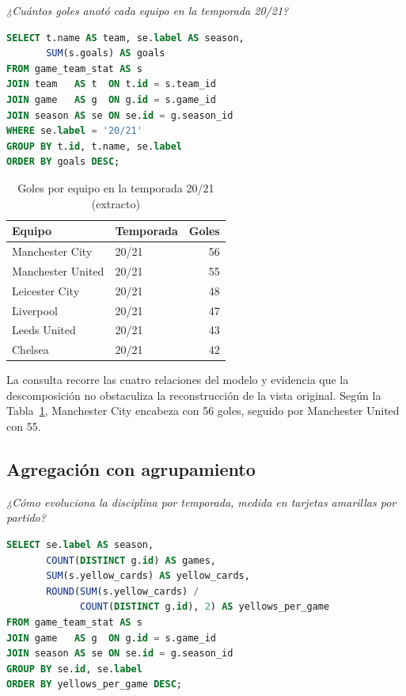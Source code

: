 \documentclass[conference]{IEEEtran}
\begin{document}
\emph{¿Cuántos goles anotó cada equipo en la temporada 20/21?}

\begin{lstlisting}[language=SQL]
SELECT t.name AS team, se.label AS season,
       SUM(s.goals) AS goals
FROM game_team_stat AS s
JOIN team   AS t  ON t.id = s.team_id
JOIN game   AS g  ON g.id = s.game_id
JOIN season AS se ON se.id = g.season_id
WHERE se.label = '20/21'
GROUP BY t.id, t.name, se.label
ORDER BY goals DESC;
\end{lstlisting}

\begin{table}[htbp]
\caption{Goles por equipo en la temporada 20/21 (extracto)}
\label{tab:goles2021}
\centering
\begin{tabular}{llr}
\toprule
\textbf{Equipo} & \textbf{Temporada} & \textbf{Goles} \\
\midrule
Manchester City   & 20/21 & 56 \\
Manchester United & 20/21 & 55 \\
Leicester City    & 20/21 & 48 \\
Liverpool         & 20/21 & 47 \\
Leeds United      & 20/21 & 43 \\
Chelsea           & 20/21 & 42 \\
\bottomrule
\end{tabular}
\end{table}

La consulta recorre las cuatro relaciones del modelo y evidencia que la
descomposición no obstaculiza la reconstrucción de la vista original. Según la
Tabla~\ref{tab:goles2021}, Manchester City encabeza con 56 goles, seguido por
Manchester United con 55.

\subsection{Agregación con agrupamiento}

\emph{¿Cómo evoluciona la disciplina por temporada, medida en tarjetas
amarillas por partido?}

\begin{lstlisting}[language=SQL]
SELECT se.label AS season,
       COUNT(DISTINCT g.id) AS games,
       SUM(s.yellow_cards) AS yellow_cards,
       ROUND(SUM(s.yellow_cards) /
             COUNT(DISTINCT g.id), 2) AS yellows_per_game
FROM game_team_stat AS s
JOIN game   AS g  ON g.id = s.game_id
JOIN season AS se ON se.id = g.season_id
GROUP BY se.id, se.label
ORDER BY yellows_per_game DESC;
\end{lstlisting}
\end{document}
